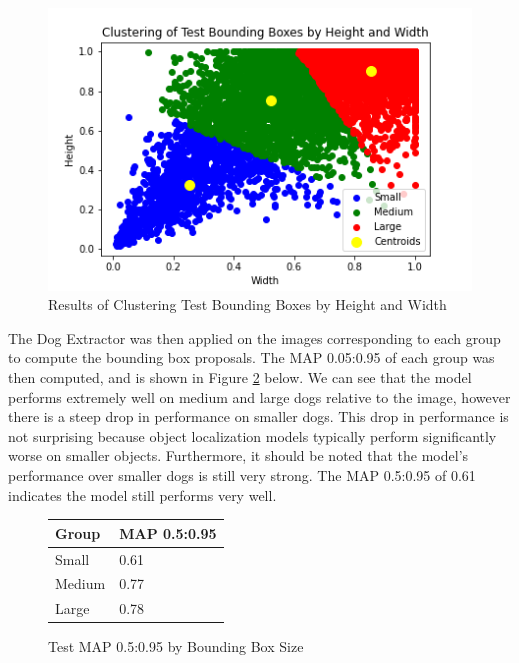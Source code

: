 \documentclass{article}
\begin{document}
\begin{figure}[h]
\centering
	\includegraphics[scale=0.7]{final-report-images/box_clusters.png}
\caption{Results of Clustering Test Bounding Boxes by Height and Width}
\label{fig:x box clusters}
\end{figure}
\noindent The Dog Extractor was then applied on the images corresponding to each group to compute the bounding box proposals.  The MAP 0.05:0.95 of each group was then computed, and is shown in Figure \ref{fig:box size} below.  We can see that the model performs extremely well on medium and large dogs relative to the image, however there is a steep drop in performance on smaller dogs.  This drop in performance is not surprising because object localization models typically perform significantly worse on smaller objects.  Furthermore, it should be noted that the model's performance over smaller dogs is still very strong.  The MAP 0.5:0.95 of 0.61 indicates the model still performs very well.

\begin{figure}[]

\begin{center}

\begin{tabular}{|l|l|}
\hline
\textbf{Group} & \textbf{MAP 0.5:0.95} \\ \hline
Small          & 0.61                  \\ \hline
Medium         & 0.77                  \\ \hline
Large          & 0.78                  \\ \hline
\end{tabular}
\end{center}
\caption{Test MAP 0.5:0.95 by Bounding Box Size}
\label{fig:box size}
\end{figure}
\end{document}
